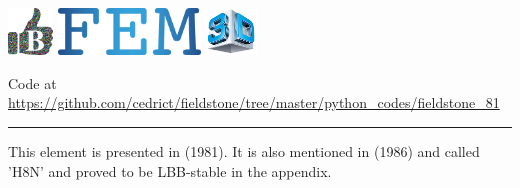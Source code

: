 \includegraphics[height=1.25cm]{images/pictograms/benchmark}
\includegraphics[height=1.25cm]{images/pictograms/FEM}
\includegraphics[height=1.25cm]{images/pictograms/3d}




\begin{center}
Code at \url{https://github.com/cedrict/fieldstone/tree/master/python_codes/fieldstone_81}
\end{center}

\par\noindent\rule{\textwidth}{0.4pt}

This element is presented in \textcite{fort81} (1981). It is 
also mentioned in \textcite{dhhu86} (1986) and called 'H8N' and 
proved to be LBB-stable in the appendix.

